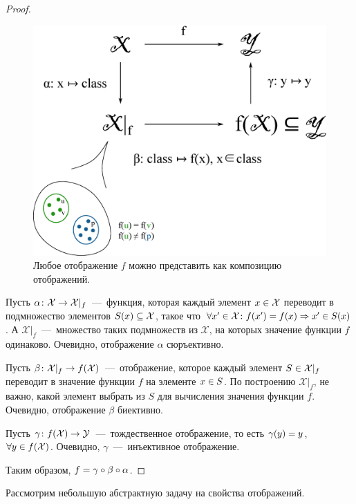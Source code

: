 \documentclass[a4paper,12pt]{article}
\begin{document}
  \begin{proof}
    \begin{figure}
      \centering
      
      \includegraphics[width=0.8\columnwidth]{tribute-to-algebraic-approach}
      
      \caption{Любое отображение $f$ можно представить как композицию отображений.}
      \label{fig:tribute-to-algebraic}
    \end{figure}
    
    Пусть $\alpha\colon \mathcal X \hm\to \mathcal X|_f$~---~функция, которая каждый элемент $x \hm\in \mathcal X$ переводит в подмножество элементов $S(x) \hm\subseteq \mathcal X$, такое что $\forall x' \hm\in \mathcal X\colon f(x') \hm= f(x) \hm\Rightarrow x' \hm\in S(x)$.
    А $\mathcal X|_f$~---~множество таких подмножеств из $\mathcal X$, на которых значение функции $f$ одинаково.
    Очевидно, отображение $\alpha$ сюръективно.
    
    Пусть $\beta\colon \mathcal X|_f \hm\to f(\mathcal X)$~---~отображение, которое каждый элемент $S \hm\in \mathcal X|_f$ переводит в значение функции $f$ на элементе $x \hm\in S$.
    По построению $\mathcal X|_f$, не важно, какой элемент выбрать из $S$ для вычисления значения функции $f$.
    Очевидно, отображение $\beta$ биективно.
    
    Пусть $\gamma\colon f(\mathcal X) \hm\to \mathcal Y$~---~тождественное отображение, то есть $\gamma(y) \hm= y$, $\forall y \hm\in f(\mathcal X)$.
    Очевидно, $\gamma$~---~инъективное отображение.
    
    Таким образом, $f \hm= \gamma \circ \beta \circ \alpha$.
  \end{proof}
  
  Рассмотрим небольшую абстрактную задачу на свойства отображений.
  
\end{document}
